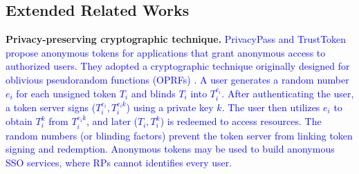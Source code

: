 \subsection{Extended Related Works}
\label{sec:related}

%
\noindent\textbf{Privacy-preserving cryptographic technique.}
\textcolor{blue}{PrivacyPass and TrustToken \cite{privacypass,trusttoken} 
 propose anonymous tokens for applications that grant anonymous access to authorized users.
They adopted a cryptographic technique originally designed for oblivious pseudorandom functions (OPRFs) \cite{oprf-proved}.
A user generates a random number $e_i$ for each unsigned token $T_i$ and blinds $T_i$ into $T_i^{e_i}$.
After authenticating the user,
 a token server signs ($T_i^{e_i}, T_i^{e_i k}$) using a private key $k$.
The user then utilizes $e_i$ to obtain $T_i^k$ from $T_i^{e_i k}$, and later ($T_i, T_i^k$) is redeemed to access resources.
The random numbers (or blinding factors) prevent the token server from linking token signing and redemption.
Anonymous tokens may be used to build anonymous SSO services,
    where RPs cannot identifies every user.}


